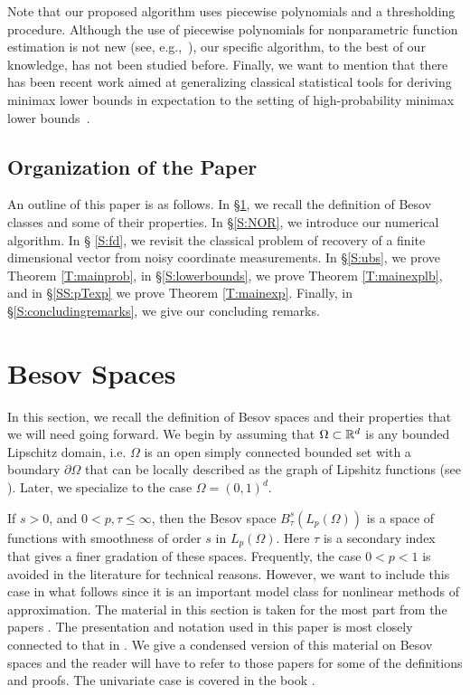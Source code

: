 Note that our proposed algorithm uses piecewise polynomials and a thresholding procedure. Although the use of piecewise polynomials for nonparametric function estimation is not new (see, e.g.,~\cite{chaudhuri1994piecewise,kolaczyk2005multiscale,binev2005universal,binev2007universal,morkisz2020complexity}), our specific algorithm, to the best of our knowledge,  has not been studied before.  Finally, we  want to mention that there has been  recent work aimed at generalizing classical statistical tools for deriving minimax lower bounds in expectation 
to the setting of high-probability minimax lower bounds~\cite{ma2024high}.


\subsection{Organization of the Paper}


An outline of this paper is as follows. In \S\ref{S:Besov}, we recall the definition of  Besov classes and some of their properties.  
In \S\ref{S:NOR}, we introduce our numerical algorithm. In \S
\ref{S:fd}, we revisit the classical problem of recovery of a finite dimensional vector from noisy coordinate measurements. In \S\ref{S:ubs}, we prove Theorem \ref{T:mainprob}, in \S\ref{S:lowerbounds}, we prove
Theorem \ref{T:mainexplb}, and
in \S\ref{SS:pTexp} we prove 
 Theorem \ref{T:mainexp}.
Finally, in \S\ref{S:concludingremarks}, we give our concluding remarks. 





\section{Besov Spaces}
\label{S:Besov}
In this section, we recall the definition of Besov spaces and  their properties that we will need going forward.  We begin by  assuming that $\Omega\subset \mathbb{R}^d$ is any bounded Lipschitz domain, i.e.  $\Omega$ is an open simply connected bounded set with a boundary $\partial\Omega$ that can be locally described as the graph of  Lipshitz functions (see \cite{DS}).  
Later, we specialize to the case $\Omega=(0,1)^d$.


 If $s>0$, and $0<p,\tau\le\infty$, then the Besov space $B_\tau^s(L_p(\Omega))$ is a space of functions with smoothness of order $s$ in $L_p(\Omega)$.  Here $\tau $
is a secondary index that gives a finer gradation of these spaces.   Frequently, the case $0<p<1$ is avoided in the literature for technical reasons.  However, we want to include this case in what follows since it is an important model class for nonlinear methods of approximation.  
The material in this section is taken for the most part from the papers \cite{DP,DS,DSmono,BDPS}.  The presentation and notation used in this paper is most closely connected to that in  \cite{BDPS}.
We give a condensed version of this material on Besov spaces and the reader will have to refer
to those papers for some of the definitions and proofs.  
The univariate
case is covered in the book \cite{DL}.

